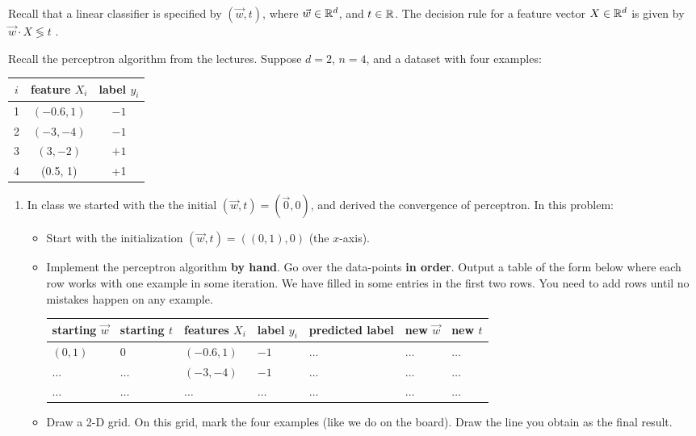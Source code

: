 \documentclass[11pt]{article}
\newenvironment{problem}[2][Problem]{\begin{trivlist}
\item[\hskip \labelsep {\bfseries #1}\hskip \labelsep {\bfseries #2.}]}{\end{trivlist}}
\begin{document}
\begin{problem}{1 (10 points)}
Recall that a linear classifier is specified by $(\vec{w},t)$, where $\vec{w}\in\mathbb{R}^d$, and $t\in\mathbb{R}$. The decision rule for a feature vector $ X\in\mathbb{R}^d$ is given by $\vec{w}\cdot {X} \lessgtr t$ .  

Recall the perceptron algorithm from the lectures. Suppose $d=2$,  $n=4$, and a dataset with four examples:
\begin{center}
  \begin{tabular}{| c | c | c |}
 \hline
$i$ &  feature $ X_i$ & label $y_i$\\
 \hline
1 & $(-0.6, 1)$& $-1$\\
2 & $(-3, -4)$& $-1$\\
3& $(3, -2)$& $+1$\\
4&  (0.5, 1)& +1\\\hline
  \end{tabular}
\end{center}

\begin{enumerate}
	\item 
In class we started with the the initial $(\vec w, t)=(\vec 0,0)$, and derived the convergence of perceptron. In this problem:
\begin{itemize}
\item
Start with the initialization $(\vec w, t)= ( (0,1), 0)$ (the $x$-axis).
\item
Implement the perceptron algorithm \textbf{by hand}. Go over the data-points \textbf{in order}. Output a table of the form below where each row works with one example in some iteration. We have filled in some entries in the first two rows. You need to add rows until no mistakes happen on any example.
\begin{center}
  \begin{tabular}{ |l |l | l | l | l | l | l| }
    \hline
     starting $\vec w$  & starting $t$  & features $X_i$& label $y_i$ & predicted label & new $\vec w$ & new $t$ \\ \hline
     $(0,1)$ & 0&  $(-0.6, 1)$ & $-1$ & $\ldots$ & $\ldots$ &$\ldots$ \\ \hline            $\ldots$ & $\ldots$ &$(-3, -4)$ & $-1$ & $\ldots$ & $\ldots$& $\ldots$\\ \hline 
          $\ldots$ &$\ldots$ & $\ldots$ & $\ldots$ & $\ldots$ & $\ldots$ & $\ldots$\\ \hline 
  \end{tabular}
\end{center}
\item
Draw a 2-D grid. On this grid, mark the four examples (like we do on the board). Draw the line you obtain as the final result. 
\end{itemize}
\end{enumerate}
\end{problem}
\end{document}
